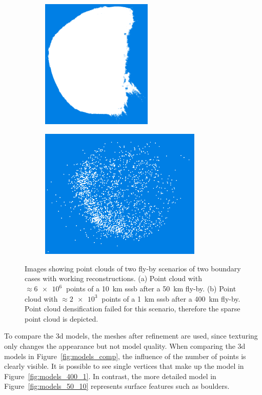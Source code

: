 \begin{figure}[htb]
    \centering
        \begin{subfigure}[b]{0.42\textwidth}
            \centering
            \includegraphics[width=\textwidth,height=6.2cm]{doc/thesis/0_figures/models_quality/50_10/120_50_10_dense2.png}
            \caption{}
            \label{fig:points_50_10}
        \end{subfigure}
        \begin{subfigure}[b]{0.42\textwidth}
            \centering
            \includegraphics[width=\textwidth,height=6.2cm]{doc/thesis/0_figures/models_quality/400_1/120_400_1_points2.png}
            \caption{}
            \label{fig:points_400_1}
        \end{subfigure}
    \caption{Images showing point clouds of two fly-by scenarios of two boundary cases with working reconstructions. (a) Point cloud with $\approx\SI{6e6}{}$ points of a \SI{10}{\kilo\meter} \gls{sssb} after a \SI{50}{\kilo\meter} fly-by. (b) Point cloud with $\approx\SI{2e3}{}$ points of a \SI{1}{\kilo\meter} \gls{sssb} after a \SI{400}{\kilo\meter} fly-by. Point cloud densification failed for this scenario, therefore the sparse point cloud is depicted.}
    \label{fig:points_dense_comp}
\end{figure}

To compare the \gls{3d} models, the meshes after refinement are used, since texturing only changes the appearance but not model quality. When comparing the \gls{3d} models in Figure~\ref{fig:models_comp}, the influence of the number of points is clearly visible. It is possible to see single vertices that make up the model in Figure~\ref{fig:models_400_1}. In contrast, the more detailed model in Figure~\ref{fig:models_50_10} represents surface features such as boulders.

